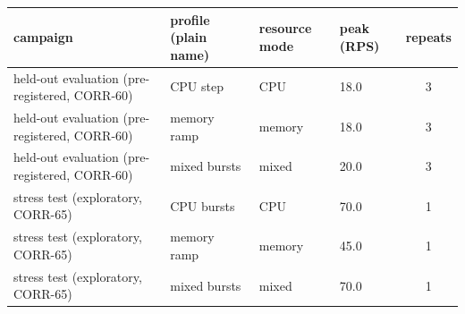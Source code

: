 \begin{tabular}{llllc}
\hline
campaign & profile (plain name) & resource mode & peak (RPS) & repeats \\
\hline
held-out evaluation (pre-registered, CORR-60) & CPU step & CPU & 18.0 & 3 \\
held-out evaluation (pre-registered, CORR-60) & memory ramp & memory & 18.0 & 3 \\
held-out evaluation (pre-registered, CORR-60) & mixed bursts & mixed & 20.0 & 3 \\
stress test (exploratory, CORR-65) & CPU bursts & CPU & 70.0 & 1 \\
stress test (exploratory, CORR-65) & memory ramp & memory & 45.0 & 1 \\
stress test (exploratory, CORR-65) & mixed bursts & mixed & 70.0 & 1 \\
\hline
\end{tabular}
